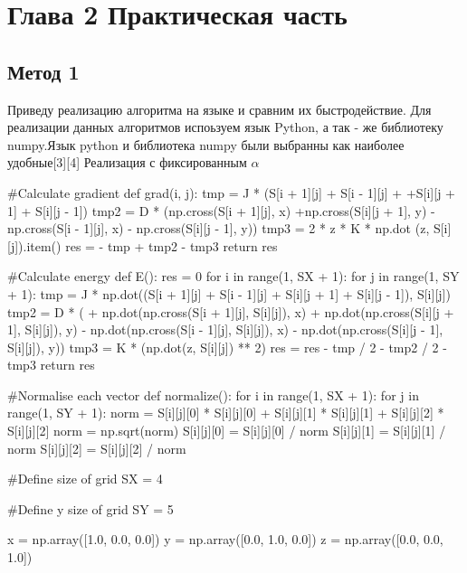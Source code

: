\documentclass[ 12pt,x11names]{article}
\begin{document}
    \section{
    Глава 2
    Практическая часть}
    \subsection{Метод 1}
    Приведу реализацию алгоритма на языке и сравним их быстродействие.
    Для реализации данных алгоритмов испоьзуем язык Python, а так - же библиотеку numpy.Язык python и библиотека numpy  были выбранны как наиболее удобные[3][4]
    Реализация с фиксированным $\alpha$\\
\begin{python}
    #Calculate gradient
    def grad(i, j):
        tmp = J * (S[i + 1][j] + S[i - 1][j] +
        +S[i][j + 1] + S[i][j - 1])
        tmp2 = D * (np.cross(S[i + 1][j], x)
        +np.cross(S[i][j + 1], y)
        - np.cross(S[i - 1][j], x)
        - np.cross(S[i][j - 1], y))
        tmp3 = 2 * z * K * np.dot  (z, S[i][j]).item()
        res = - tmp + tmp2 - tmp3
        return res

    #Calculate energy
    def E():
        res = 0
        for i in range(1, SX + 1):
            for j in range(1, SY + 1):
                tmp = J * np.dot((S[i + 1][j] + S[i - 1][j] +
                S[i][j + 1] + S[i][j - 1]), S[i][j])
                tmp2 = D * (
                + np.dot(np.cross(S[i + 1][j], S[i][j]), x)
                + np.dot(np.cross(S[i][j + 1], S[i][j]), y)
                - np.dot(np.cross(S[i - 1][j], S[i][j]), x)
                - np.dot(np.cross(S[i][j - 1], S[i][j]), y))
                tmp3 = K * (np.dot(z, S[i][j]) ** 2)
                res = res - tmp / 2 - tmp2 / 2 - tmp3
        return res

    #Normalise each vector
    def normalize():
    for i in range(1, SX + 1):
        for j in range(1, SY + 1):
            norm = S[i][j][0] * S[i][j][0] +
                   S[i][j][1] * S[i][j][1] +
                   S[i][j][2] * S[i][j][2]
            norm = np.sqrt(norm)
            S[i][j][0] = S[i][j][0] / norm
            S[i][j][1] = S[i][j][1] / norm
            S[i][j][2] = S[i][j][2] / norm


    #Define size of grid
    SX = 4

    #Define y size of grid
    SY = 5

    x = np.array([1.0, 0.0, 0.0])
    y = np.array([0.0, 1.0, 0.0])
    z = np.array([0.0, 0.0, 1.0])


\end{python}
\end{document}
